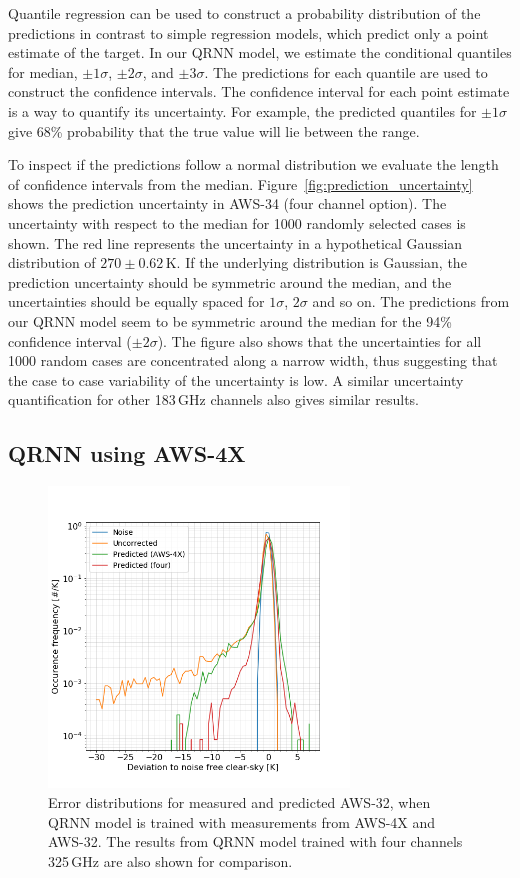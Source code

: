 \documentclass[12pt]{article}
\begin{document}
Quantile regression can be used to construct a probability distribution of the
predictions in contrast to simple regression models, which predict only a point
estimate of the target. In our QRNN model, we estimate the conditional
quantiles for median, $\pm 1\sigma$, $\pm 2\sigma$, and $\pm 3\sigma$. The
predictions for each quantile are used to construct the confidence intervals.
The confidence interval for each point estimate is a way to quantify its
uncertainty. For example, the predicted quantiles for $\pm 1 \sigma$ give 68\%
probability that the true value will lie between the range.

To inspect if the predictions follow a normal distribution we evaluate the
length of confidence intervals from the median.
Figure~\ref{fig:prediction_uncertainty} shows the prediction uncertainty in
AWS-34 (four channel option). The uncertainty with respect to the median for
1000 randomly selected cases is shown. The red line represents the uncertainty
in a hypothetical Gaussian distribution of $270\pm0.62$\,K. If the underlying
distribution is Gaussian, the prediction uncertainty should be symmetric around
the median, and the uncertainties should be equally spaced for $1\sigma$,
$2\sigma$ and so on. The predictions from our QRNN model seem to be symmetric
around the median for the 94\% confidence interval ($\pm 2 \sigma$). The figure
also shows that the uncertainties for all 1000 random cases are concentrated
along a narrow width, thus suggesting that the case to case variability of the
uncertainty is low. A similar uncertainty quantification for other 183\,GHz
channels also gives similar results.

\subsection{QRNN using AWS-4X}
%
\begin{figure}[!tb]
	\centering
	\includegraphics[height=80mm]{Channel_C32_C4X.png}
	\caption{ Error distributions for measured and predicted AWS-32, when QRNN  model is trained with measurements from AWS-4X and AWS-32. The results from QRNN model trained with four channels 325\,GHz are also shown for comparison. }
	\label{fig:qrnn_C32_C4X:deviations}
\end{figure}
\end{document}
